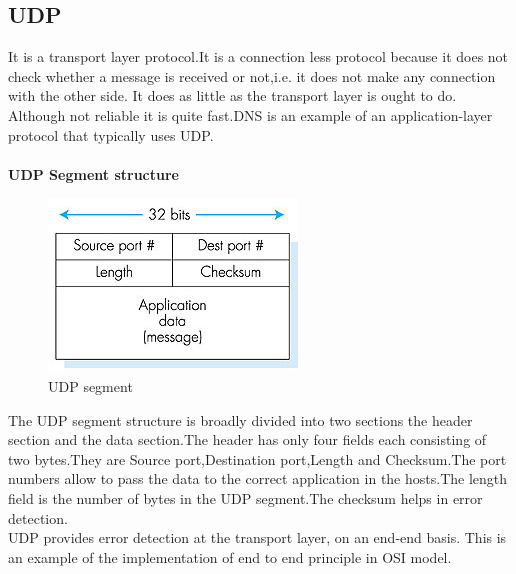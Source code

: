 \documentclass{article}
\begin{document}
\subsection{UDP}
It is a transport layer protocol.It is a connection less protocol because it does not check whether a message is received or not,i.e. it does not make any connection with the other side. It does as little as the transport layer is ought to do. Although not reliable it is quite fast.DNS is an example of an application-layer protocol that typically uses UDP.\\\\
\textbf{UDP Segment structure}\\
\begin{figure}
\begin{center}
    
        \includegraphics{udp2.jpg}
    \caption{UDP segment}

\end{center}
 \end{figure}
The UDP segment structure is broadly divided into two sections the header section and the data section.The header has only four fields each consisting of two bytes.They are Source port,Destination port,Length and Checksum.The port numbers allow to pass the data to the correct application in the hosts.The length field is the number of bytes in the UDP segment.The checksum helps in error detection.\\
UDP provides error detection at the transport layer, on an end-end basis. This is an example of the implementation of end to end principle in OSI model.
\end{document}
